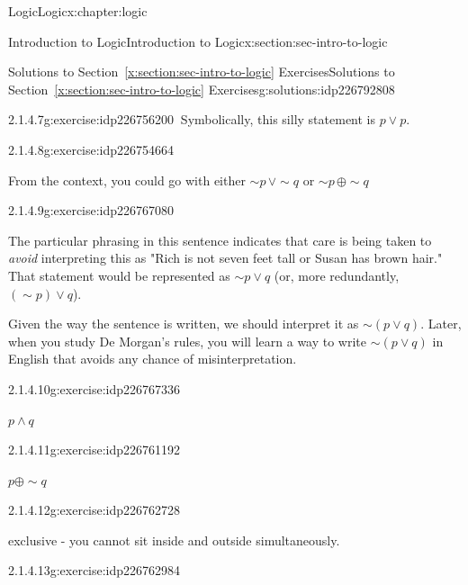 \documentclass[twoside,10pt,]{book}
\newcommand{\xreffont}{\relax}
\numberwithin{equation}{section}
\begin{document}
\begin{chapterptx}{Logic}{}{Logic}{}{}{x:chapter:logic}
\begin{sectionptx}{Introduction to Logic}{}{Introduction to Logic}{}{}{x:section:sec-intro-to-logic}
\begin{solutions-subsection}{Solutions to Section~{\xreffont\ref*{x:section:sec-intro-to-logic}} Exercises}{}{Solutions to Section~{\xreffont\ref*{x:section:sec-intro-to-logic}} Exercises}{}{}{g:solutions:idp226792808}
\begin{exercisegroup}
\begin{divisionsolutioneg}{2.1.4.7}{}{g:exercise:idp226756200}
\noindent\hypertarget{g:solution:idp226759400-main}{}\(\ \)Symbolically, this silly statement is \(p{\vee} p\).\end{divisionsolutioneg}%
\begin{divisionsolutioneg}{2.1.4.8}{}{g:exercise:idp226754664}%
\par\smallskip%
\noindent\hypertarget{g:solution:idp226764776-main}{}From the context, you could go with either \(\sim\!{p}\,{\vee} \sim\!{q}\) or \(\sim\!{p}\,{\oplus}\sim\!{q}\)\end{divisionsolutioneg}%
\begin{divisionsolutioneg}{2.1.4.9}{}{g:exercise:idp226767080}%
\par\smallskip%
\noindent\hypertarget{g:solution:idp226764008-main}{}The particular phrasing in this sentence indicates that care is being taken to \emph{avoid} interpreting this as "Rich is not seven feet tall or Susan has brown hair."  That statement would be represented as \(\sim\!{p}{\vee} q\) (or, more redundantly, \((\sim\!{p}){\vee} q\)).%
\par
Given the way the sentence is written, we should interpret it as \(\sim\! (p{\vee} q)\).  Later, when you study De Morgan's rules, you will learn a way to write \(\sim\!(p{\vee} q)\) in English that avoids any chance of misinterpretation.%
\end{divisionsolutioneg}%
\begin{divisionsolutioneg}{2.1.4.10}{}{g:exercise:idp226767336}%
\par\smallskip%
\noindent\hypertarget{g:solution:idp226765544-main}{}\(p{\wedge} q\)\end{divisionsolutioneg}%
\begin{divisionsolutioneg}{2.1.4.11}{}{g:exercise:idp226761192}%
\par\smallskip%
\noindent\hypertarget{g:solution:idp226766440-main}{}\(p{\oplus} \sim\!{q}\)\end{divisionsolutioneg}%
\end{exercisegroup}
\par\medskip\noindent
\begin{exercisegroup}
\begin{divisionsolutioneg}{2.1.4.12}{}{g:exercise:idp226762728}%
\par\smallskip%
\noindent\hypertarget{g:solution:idp226761576-main}{}exclusive - you cannot sit inside and outside simultaneously.\end{divisionsolutioneg}%
\begin{divisionsolutioneg}{2.1.4.13}{}{g:exercise:idp226762984}%

\end{divisionsolutioneg}
\end{exercisegroup}
\end{solutions-subsection}
\end{sectionptx}
\end{chapterptx}
\end{document}
